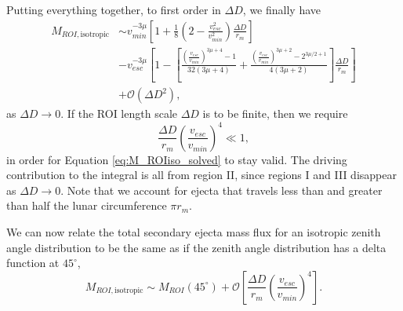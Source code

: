 \documentclass{hitec}
\numberwithin{equation}{section}
\begin{document}
Putting everything together, to first order in $\Delta D$, we finally have
\begin{align}\label{eq:M_ROIiso_solved}
M_{ROI,\text{isotropic}}
&\sim
v_{min}^{-3\mu}\left[1 + \frac{1}{8}\left(2-\frac{v_{esc}^2}{v_{min}^2}\right)\frac{\Delta D}{r_m}\right] \\\nonumber
&-v_{esc}^{-3\mu}\left[1-\left[ \frac{\left(\frac{v_{esc}}{v_{min}}\right)^{3\mu+4}-1}{32(3\mu+4)} + \frac{\left(\frac{v_{esc}}{v_{min}}\right)^{3\mu+2}-2^{3\mu/2+1}}{4(3\mu+2)} \right]\frac{\Delta D}{r_m}\right]\\\nonumber
&+\mathcal{O}(\Delta D^2),
\end{align}
as $\Delta D\to 0$. If the ROI length scale $\Delta D$ is to be finite, then we require
\begin{equation}
\frac{\Delta D}{r_m}\left(\frac{v_{esc}}{v_{min}}\right)^{4} \ll 1,
\end{equation}
in order for Equation \eqref{eq:M_ROIiso_solved} to stay valid. The driving contribution to the integral is all from region II, since regions I and III disappear as $\Delta D\to 0$. Note that we account for ejecta that travels less than and greater than half the lunar circumference $\pi r_m$.

We can now relate the total secondary ejecta mass flux for an isotropic zenith angle distribution to be the same as if the zenith angle distribution has a delta function at $45^\circ$,
\begin{equation}
M_{ROI,\text{isotropic}} \sim M_{ROI}(45^\circ) + \mathcal{O}\left[\frac{\Delta D}{r_m}\left(\frac{v_{esc}}{v_{min}}\right)^{4}\right].
\end{equation}



\cleardoublepage
{}
{}


\end{document}
